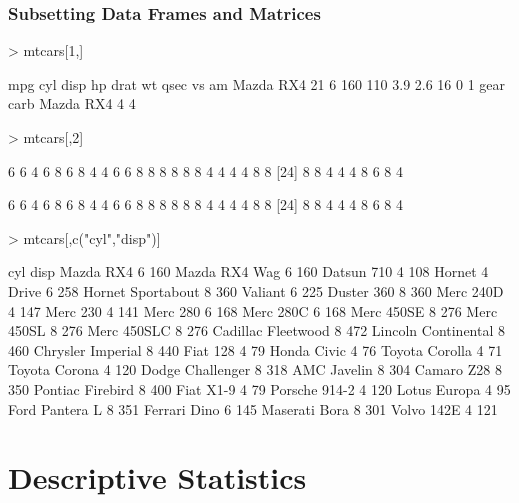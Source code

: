 \documentclass[10pt,slidestop,mathserif,c]{beamer}
\begin{document}
\begin{frame}
	\frametitle{Subsetting Data Frames and Matrices}
\begin{Schunk}
\begin{Sinput}
> mtcars[1,]
\end{Sinput}
\begin{Soutput}
          mpg cyl disp  hp drat  wt qsec vs am
Mazda RX4  21   6  160 110  3.9 2.6   16  0  1
          gear carb
Mazda RX4    4    4
\end{Soutput}
\begin{Sinput}
> mtcars[,2]
\end{Sinput}
\begin{Soutput}
 [1] 6 6 4 6 8 6 8 4 4 6 6 8 8 8 8 8 8 4 4 4 4 8 8
[24] 8 8 4 4 4 8 6 8 4
\end{Soutput}
\begin{Soutput}
 [1] 6 6 4 6 8 6 8 4 4 6 6 8 8 8 8 8 8 4 4 4 4 8 8
[24] 8 8 4 4 4 8 6 8 4
\end{Soutput}
\begin{Sinput}
> mtcars[,c("cyl","disp")]
\end{Sinput}
\begin{Soutput}
                    cyl disp
Mazda RX4             6  160
Mazda RX4 Wag         6  160
Datsun 710            4  108
Hornet 4 Drive        6  258
Hornet Sportabout     8  360
Valiant               6  225
Duster 360            8  360
Merc 240D             4  147
Merc 230              4  141
Merc 280              6  168
Merc 280C             6  168
Merc 450SE            8  276
Merc 450SL            8  276
Merc 450SLC           8  276
Cadillac Fleetwood    8  472
Lincoln Continental   8  460
Chrysler Imperial     8  440
Fiat 128              4   79
Honda Civic           4   76
Toyota Corolla        4   71
Toyota Corona         4  120
Dodge Challenger      8  318
AMC Javelin           8  304
Camaro Z28            8  350
Pontiac Firebird      8  400
Fiat X1-9             4   79
Porsche 914-2         4  120
Lotus Europa          4   95
Ford Pantera L        8  351
Ferrari Dino          6  145
Maserati Bora         8  301
Volvo 142E            4  121
\end{Soutput}
\end{Schunk}
\end{frame}


\section{Descriptive Statistics}
\end{document}
